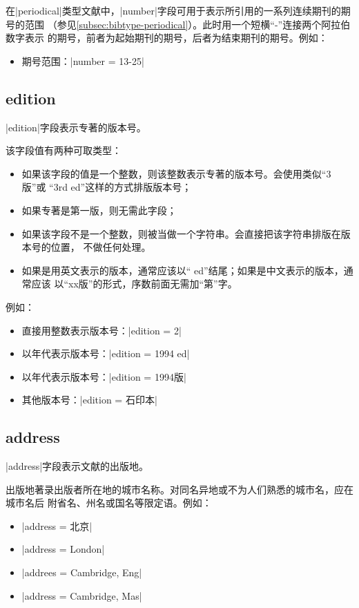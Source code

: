 在|periodical|类型文献中，|number|字段可用于表示所引用的一系列连续期刊的期号的范围
（参见\ref{subsec:bibtype-periodical}）。此时用一个短横``-''连接两个阿拉伯数字表示
的期号，前者为起始期刊的期号，后者为结束期刊的期号。例如：
\begin{itemize}
\item 期号范围：|number = {13-25}|
\end{itemize}


\subsection{edition}\label{subsec:bibfield-edition}

|edition|字段表示专著的版本号。

该字段值有两种可取类型：
\begin{itemize}
\item 如果该字段的值是一个整数，则该整数表示专著的版本号。{\BibTeX}会使用类似``3版''或
``3rd ed''这样的方式排版版本号；
\item 如果专著是第一版，则无需此字段；
\item 如果该字段不是一个整数，则被当做一个字符串。{\BibTeX}会直接把该字符串排版在版本号的位置，
不做任何处理。
\item 如果是用英文表示的版本，通常应该以`` ed''结尾；如果是中文表示的版本，通常应该
以``xx版''的形式，序数前面无需加``第''字。
\end{itemize}

例如：
\begin{itemize}
\item 直接用整数表示版本号：|edition = {2}|
\item 以年代表示版本号：|edition = {1994 ed}|
\item 以年代表示版本号：|edition = {1994版}|
\item 其他版本号：|edition = {石印本}|
\end{itemize}

\subsection{address}\label{subsec:bibfield-address}

|address|字段表示文献的出版地。

出版地著录出版者所在地的城市名称。对同名异地或不为人们熟悉的城市名，应在城市名后
附省名、州名或国名等限定语。例如：
\begin{itemize}
\item |address = {北京}|
\item |address = {London}|
\item |addrees = {Cambridge, Eng}|
\item |address = {Cambridge, Mas}|
\end{itemize}

